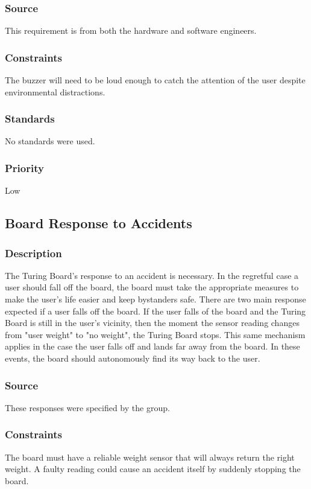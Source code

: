 \subsubsection{Source}
This requirement is from both the hardware and software engineers.
\subsubsection{Constraints}
The buzzer will need to be loud enough to catch the attention of the user despite environmental distractions.
\subsubsection{Standards}
No standards were used.
\subsubsection{Priority}
Low

\subsection{Board Response to Accidents}
\subsubsection{Description}
The Turing Board's response to an accident is necessary. In the regretful case a user should fall off the board, the board must take the appropriate measures to make the user's life easier and keep bystanders safe. There are two main response expected if a user falls off the board. If the user falls of the board and the Turing Board is still in the user's vicinity, then the moment the sensor reading changes from "user weight" to "no weight", the Turing Board stops. This same mechanism applies in the case the user falls off and lands far away from the board. In these events, the board should autonomously find its way back to the user.
\subsubsection{Source}
These responses were specified by the group.
\subsubsection{Constraints}
The board must have a reliable weight sensor that will always return the right weight. A faulty reading could cause an accident itself by suddenly stopping the board.
